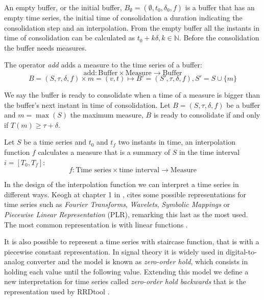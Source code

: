 An empty buffer, or the initial buffer, $B_{\emptyset} =
(\emptyset,t_0, \delta_0, f)$ is a buffer that has an empty time
series, the initial time of consolidation a duration indicating the
consolidation step and an interpolation. From the empty buffer all the
instants in time of consolidation can be calculated as $t_0+k\delta,
k\in\mathbb{N}$. Before the consolidation the buffer needs measures.

\begin{definition}
  The operator \emph{add} adds a measure to the time series of a buffer:
  \[
  \text{add}: \text{Buffer} \times \text{Measure} \longrightarrow \text{Buffer}
  \]
  \[
   B = (S,\tau,\delta,f)  \times m = (v,t) \mapsto B'= (S',\tau,\delta,f),
   S' = S \cup \{m\}
   \] 
\end{definition}

\begin{definition}
  We say the buffer is ready to consolidate when a time of a measure
  is bigger than the buffer's next instant in time of consolidation.
  Let $B=(S,\tau,\delta,f)$ be a buffer and $m=\max(S)$ the maximum
  measure, $B$ is ready to consolidate if and only if $T(m) \geq
  \tau+\delta$.
\end{definition}

Let $S$ be a time series and $t_0$ and $t_f$ two instants in time, an
interpolation function $f$ calculates a measure that is a summary of
$S$ in the time interval $i=[T_0,T_f]$:
\[
f: \text{Time series} \times \text{time interval} \longrightarrow
\text{Measure}
\]


In the design of the interpolation function we can interpret a time
series in different ways. Keogh at chapter 1 in \cite{last}, cites
some possible representations for time series such as \emph{Fourier
  Transforms}, \emph{Wavelets}, \emph{Symbolic Mappings} or
\emph{Piecewise Linear Representation} (PLR), remarking this last as
the most used. The most common representation is with linear
functions \parencite{keogh01}.

It is also possible to represent a time series with staircase
function, that is with a piecewise constant representation. In signal
theory it is widely used in digital-to-analog converter and the model
is known as \emph{zero-order hold}, which consists in holding each
value until the following value. Extending this model we define a new
interpretation for time series called \emph{zero-order hold backwards}
that is the representation used by RRDtool \parencite{lisa98:oetiker}.

